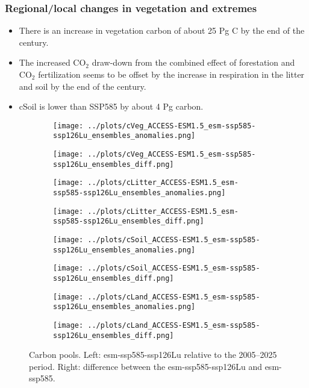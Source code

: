 \documentclass[]{article}
\begin{document}
\subsubsection{Regional/local changes in vegetation and extremes}

\begin{itemize}
    \item There is an increase in vegetation carbon of about 25 Pg C by the end of the century.
    \item The increased CO$_2$ draw-down from the combined effect of forestation and CO$_2$ fertilization seems to be offset by the increase in respiration in the litter and soil by the end of the century.
    \item cSoil is lower than SSP585 by about 4 Pg carbon.
\end{itemize}

\begin{figure}[H]
    \centering
    \begin{subfigure}[b]{0.4\linewidth}
        \texttt{[image: ../plots/cVeg\_ACCESS-ESM1.5\_esm-ssp585-ssp126Lu\_ensembles\_anomalies.png]}
    \end{subfigure}
    \begin{subfigure}[b]{0.4\linewidth}
        \texttt{[image: ../plots/cVeg\_ACCESS-ESM1.5\_esm-ssp585-ssp126Lu\_ensembles\_diff.png]}
    \end{subfigure}
    \begin{subfigure}[b]{0.4\linewidth}
        \texttt{[image: ../plots/cLitter\_ACCESS-ESM1.5\_esm-ssp585-ssp126Lu\_ensembles\_anomalies.png]}
    \end{subfigure}
    \begin{subfigure}[b]{0.4\linewidth}
        \texttt{[image: ../plots/cLitter\_ACCESS-ESM1.5\_esm-ssp585-ssp126Lu\_ensembles\_diff.png]}
    \end{subfigure}
    \begin{subfigure}[b]{0.4\linewidth}
        \texttt{[image: ../plots/cSoil\_ACCESS-ESM1.5\_esm-ssp585-ssp126Lu\_ensembles\_anomalies.png]}
    \end{subfigure}
    \begin{subfigure}[b]{0.4\linewidth}
        \texttt{[image: ../plots/cSoil\_ACCESS-ESM1.5\_esm-ssp585-ssp126Lu\_ensembles\_diff.png]}
    \end{subfigure}
\begin{subfigure}[b]{0.4\linewidth}
        \texttt{[image: ../plots/cLand\_ACCESS-ESM1.5\_esm-ssp585-ssp126Lu\_ensembles\_anomalies.png]}
    \end{subfigure}
    \begin{subfigure}[b]{0.4\linewidth}
        \texttt{[image: ../plots/cLand\_ACCESS-ESM1.5\_esm-ssp585-ssp126Lu\_ensembles\_diff.png]}
    \end{subfigure}
    \caption{Carbon pools. Left: esm-ssp585-ssp126Lu relative to the 2005–2025 period. Right: difference between the esm-ssp585-ssp126Lu and esm-ssp585.}
    \label{fig:cpools}
\end{figure}
\end{document}
